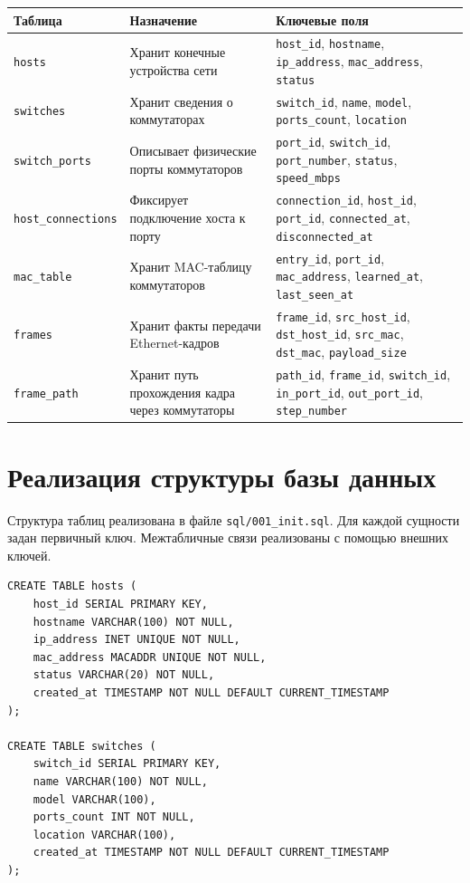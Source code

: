 \documentclass[12pt,a4paper]{article}
\begin{document}
\begin{longtable}{|p{3.2cm}|p{4.2cm}|p{7.5cm}|}
\hline
\textbf{Таблица} & \textbf{Назначение} & \textbf{Ключевые поля}\\
\hline
\texttt{hosts} & Хранит конечные устройства сети & \texttt{host\_id}, \texttt{hostname}, \texttt{ip\_address}, \texttt{mac\_address}, \texttt{status}\\
\hline
\texttt{switches} & Хранит сведения о коммутаторах & \texttt{switch\_id}, \texttt{name}, \texttt{model}, \texttt{ports\_count}, \texttt{location}\\
\hline
\texttt{switch\_ports} & Описывает физические порты коммутаторов & \texttt{port\_id}, \texttt{switch\_id}, \texttt{port\_number}, \texttt{status}, \texttt{speed\_mbps}\\
\hline
\texttt{host\_connections} & Фиксирует подключение хоста к порту & \texttt{connection\_id}, \texttt{host\_id}, \texttt{port\_id}, \texttt{connected\_at}, \texttt{disconnected\_at}\\
\hline
\texttt{mac\_table} & Хранит MAC-таблицу коммутаторов & \texttt{entry\_id}, \texttt{port\_id}, \texttt{mac\_address}, \texttt{learned\_at}, \texttt{last\_seen\_at}\\
\hline
\texttt{frames} & Хранит факты передачи Ethernet-кадров & \texttt{frame\_id}, \texttt{src\_host\_id}, \texttt{dst\_host\_id}, \texttt{src\_mac}, \texttt{dst\_mac}, \texttt{payload\_size}\\
\hline
\texttt{frame\_path} & Хранит путь прохождения кадра через коммутаторы & \texttt{path\_id}, \texttt{frame\_id}, \texttt{switch\_id}, \texttt{in\_port\_id}, \texttt{out\_port\_id}, \texttt{step\_number}\\
\hline
\end{longtable}

\section{Реализация структуры базы данных}

Структура таблиц реализована в файле \texttt{sql/001\_init.sql}. Для каждой сущности задан первичный ключ. Межтабличные связи реализованы с помощью внешних ключей.

\begin{lstlisting}[caption={Пример создания таблиц hosts и switches}]
CREATE TABLE hosts (
    host_id SERIAL PRIMARY KEY,
    hostname VARCHAR(100) NOT NULL,
    ip_address INET UNIQUE NOT NULL,
    mac_address MACADDR UNIQUE NOT NULL,
    status VARCHAR(20) NOT NULL,
    created_at TIMESTAMP NOT NULL DEFAULT CURRENT_TIMESTAMP
);

CREATE TABLE switches (
    switch_id SERIAL PRIMARY KEY,
    name VARCHAR(100) NOT NULL,
    model VARCHAR(100),
    ports_count INT NOT NULL,
    location VARCHAR(100),
    created_at TIMESTAMP NOT NULL DEFAULT CURRENT_TIMESTAMP
);
\end{lstlisting}
\end{document}
